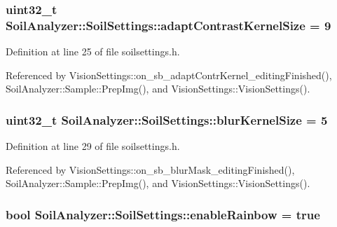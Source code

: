 \subsubsection[{adapt\+Contrast\+Kernel\+Size}]{\setlength{\rightskip}{0pt plus 5cm}uint32\+\_\+t Soil\+Analyzer\+::\+Soil\+Settings\+::adapt\+Contrast\+Kernel\+Size = 9}\label{class_soil_analyzer_1_1_soil_settings_a73f627b092dbdbda37b66ef6c2eef95c}


Definition at line 25 of file soilsettings.\+h.



Referenced by Vision\+Settings\+::on\+\_\+sb\+\_\+adapt\+Contr\+Kernel\+\_\+editing\+Finished(), Soil\+Analyzer\+::\+Sample\+::\+Prep\+Img(), and Vision\+Settings\+::\+Vision\+Settings().

\hypertarget{class_soil_analyzer_1_1_soil_settings_afa46542d30045e00fadbdd5a6ab9a1e1}{}
\subsubsection[{blur\+Kernel\+Size}]{\setlength{\rightskip}{0pt plus 5cm}uint32\+\_\+t Soil\+Analyzer\+::\+Soil\+Settings\+::blur\+Kernel\+Size = 5}\label{class_soil_analyzer_1_1_soil_settings_afa46542d30045e00fadbdd5a6ab9a1e1}


Definition at line 29 of file soilsettings.\+h.



Referenced by Vision\+Settings\+::on\+\_\+sb\+\_\+blur\+Mask\+\_\+editing\+Finished(), Soil\+Analyzer\+::\+Sample\+::\+Prep\+Img(), and Vision\+Settings\+::\+Vision\+Settings().

\hypertarget{class_soil_analyzer_1_1_soil_settings_a9ece0b96eb8614a497fba3a19d8b4da1}{}
\subsubsection[{enable\+Rainbow}]{\setlength{\rightskip}{0pt plus 5cm}bool Soil\+Analyzer\+::\+Soil\+Settings\+::enable\+Rainbow = true}\label{class_soil_analyzer_1_1_soil_settings_a9ece0b96eb8614a497fba3a19d8b4da1}


